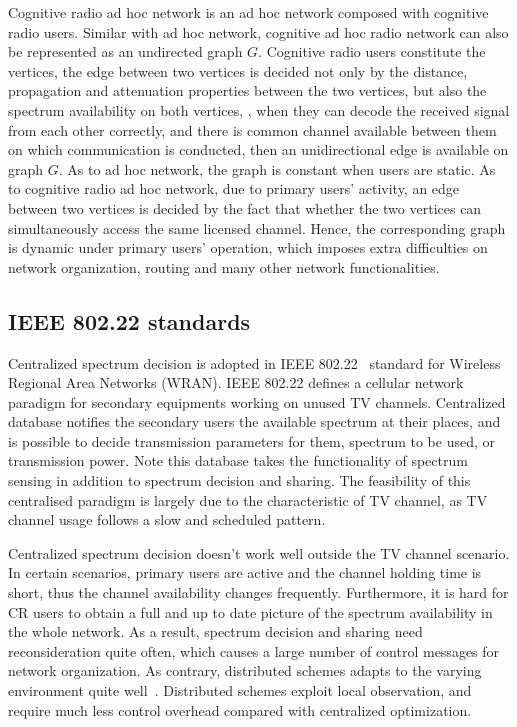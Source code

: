 Cognitive radio ad hoc network is an ad hoc network composed with cognitive radio users.
Similar with ad hoc network, cognitive ad hoc radio network can also be represented as an undirected graph $G$.
Cognitive radio users constitute the vertices, the edge between two vertices is decided not only by the distance, propagation and attenuation properties between the two vertices, but also the spectrum availability on both vertices, \ie, when they can decode the received signal from each other correctly, and there is common channel available between them on which communication is conducted, then an unidirectional edge is available on graph $G$.
As to ad hoc network, the graph is constant when users are static.
As to cognitive radio ad hoc network, due to primary users' activity, an edge between two vertices is decided by the fact that whether the two vertices can simultaneously access the same licensed channel.
Hence, the corresponding graph is dynamic under primary users' operation, which imposes extra difficulties on network organization, routing and many other network functionalities.

\subsection{IEEE 802.22 standards}
Centralized spectrum decision is adopted in IEEE 802.22~\cite{802.22} standard for Wireless Regional Area Networks (WRAN).
IEEE 802.22 defines a cellular network paradigm for secondary equipments working on unused TV channels.
Centralized database notifies the secondary users the available spectrum at their places, and is possible to decide transmission parameters for them, \ie spectrum to be used, or transmission power.
Note this database takes the functionality of spectrum sensing in addition to spectrum decision and sharing.
The feasibility of this centralised paradigm is largely due to the characteristic of TV channel, as TV channel usage follows a slow and scheduled pattern. 

Centralized spectrum decision doesn't work well outside the TV channel scenario.
In certain scenarios, primary users are active and the channel holding time is short, thus the channel availability changes frequently.
Furthermore, it is hard for CR users to obtain a full and up to date picture of the spectrum availability in the whole network.
As a result, spectrum decision and sharing need reconsideration quite often, which causes a large number of control messages for network organization.
As contrary, distributed schemes adapts to the varying environment quite well~\cite{Selforganization_CRN_13}.
Distributed schemes exploit local observation, and require much less control overhead compared with centralized optimization.

